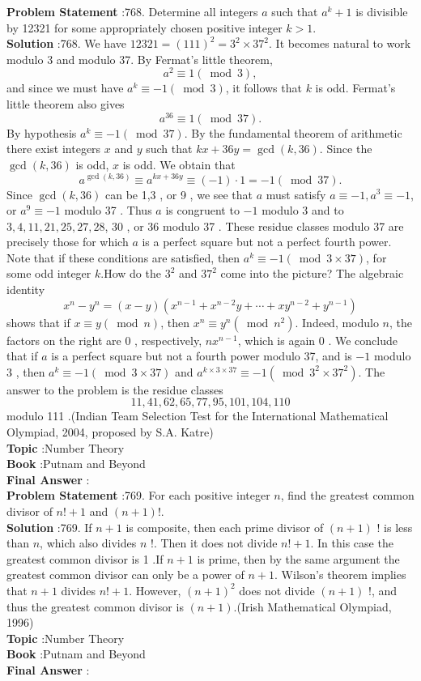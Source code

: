 \documentclass[10pt]{article}
\begin{document}
\textbf{Problem Statement} :768. Determine all integers $a$ such that $a^{k}+1$ is divisible by 12321 for some appropriately chosen positive integer $k>1$.\\
\textbf{Solution} :768. We have $12321=(111)^{2}=3^{2} \times 37^{2}$. It becomes natural to work modulo 3 and modulo 37. By Fermat's little theorem,$$ a^{2} \equiv 1(\bmod 3), $$and since we must have $a^{k} \equiv-1(\bmod 3)$, it follows that $k$ is odd. Fermat's little theorem also gives$$ a^{36} \equiv 1(\bmod 37) . $$By hypothesis $a^{k} \equiv-1(\bmod 37)$. By the fundamental theorem of arithmetic there exist integers $x$ and $y$ such that $k x+36 y=\operatorname{gcd}(k, 36)$. Since the $\operatorname{gcd}(k, 36)$ is odd, $x$ is odd. We obtain that$$ a^{\operatorname{gcd}(k, 36)} \equiv a^{k x+36 y} \equiv(-1) \cdot 1=-1(\bmod 37) . $$Since $\operatorname{gcd}(k, 36)$ can be 1,3 , or 9 , we see that $a$ must satisfy $a \equiv-1, a^{3} \equiv-1$, or $a^{9} \equiv-1$ modulo 37 . Thus $a$ is congruent to $-1$ modulo 3 and to $3,4,11,21,25,27,28$, 30 , or 36 modulo 37 . These residue classes modulo 37 are precisely those for which $a$ is a perfect square but not a perfect fourth power. Note that if these conditions are satisfied, then $a^{k} \equiv-1(\bmod 3 \times 37)$, for some odd integer $k$.How do the $3^{2}$ and $37^{2}$ come into the picture? The algebraic identity$$ x^{n}-y^{n}=(x-y)\left(x^{n-1}+x^{n-2} y+\cdots+x y^{n-2}+y^{n-1}\right) $$shows that if $x \equiv y(\bmod n)$, then $x^{n} \equiv y^{n}\left(\bmod n^{2}\right)$. Indeed, modulo $n$, the factors on the right are 0 , respectively, $n x^{n-1}$, which is again 0 . We conclude that if $a$ is a perfect square but not a fourth power modulo 37, and is $-1$ modulo 3 , then $a^{k} \equiv-1(\bmod 3 \times 37)$ and $a^{k \times 3 \times 37} \equiv-1\left(\bmod 3^{2} \times 37^{2}\right)$. The answer to the problem is the residue classes$$ 11,41,62,65,77,95,101,104,110 $$modulo 111 .(Indian Team Selection Test for the International Mathematical Olympiad, 2004, proposed by S.A. Katre)\\
\textbf{Topic} :Number Theory\\
\textbf{Book} :Putnam and Beyond\\
\textbf{Final Answer} :\\


\textbf{Problem Statement} :769. For each positive integer $n$, find the greatest common divisor of $n !+1$ and $(n+1) !$.\\
\textbf{Solution} :769. If $n+1$ is composite, then each prime divisor of $(n+1)$ ! is less than $n$, which also divides $n$ !. Then it does not divide $n !+1$. In this case the greatest common divisor is 1 .If $n+1$ is prime, then by the same argument the greatest common divisor can only be a power of $n+1$. Wilson's theorem implies that $n+1$ divides $n !+1$. However, $(n+1)^{2}$ does not divide $(n+1)$ !, and thus the greatest common divisor is $(n+1)$.(Irish Mathematical Olympiad, 1996)\\
\textbf{Topic} :Number Theory\\
\textbf{Book} :Putnam and Beyond\\
\textbf{Final Answer} :\\
\end{document}
